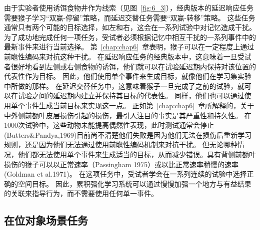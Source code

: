 由于实验者使用诱饵食物井作为线索（见图~\ref{fig:6_3}），经典版本的延迟响应任务需要猴子学习“双赢-停留”策略，而延迟交替任务需要“双赢-转移”策略。
这些任务通常只有两个可能的目标选择，如左和右，这会在一系列试验中对记忆造成干扰。
为了成功地完成任何一项任务，受试者必须根据记忆中相互干扰的一系列事件中的最新事件来进行当前选择。
第~\ref{chap:chap6}~章表明，猴子可以在一定程度上通过前瞻性编码来对抗这种干扰。
在延迟响应任务的经典版本中，这意味着一旦受试者很好地看到左侧或右侧食物的诱饵，他们就可以在试验延迟期内保持对该位置的代表性作为目标。
因此，他们使用单个事件来生成目标，就像他们在学习集实验中所做的那样。
在延迟交替任务中，这意味着猴子一旦完成了之前的试验，就可以在试验之间的延迟期内建立并保持其目标的代表性。
同样，他们也可以通过使用单个事件生成当前目标来实现这一点。
正如第~\ref{chap:chap6}~章所解释的，关于中外侧前额叶皮层损伤引起的损伤，最引人注目的事实是其严重性和持久性。
在1000次试验中，这些动物未能提高偶然性表现，此时测试通常会停止(Butters\&Pandya,1969)目前尚不清楚他们失败是因为他们无法在损伤后重新学习规则，还是因为他们无法通过使用前瞻性编码机制来对抗干扰。
但无论哪种情况，他们都无法使用单个事件来生成适当的目标，从而减少错误。具有背侧前额叶损伤的猴子可以以正常速率（Passingham 1975）或以比正常速率稍慢的速率(Goldman et al.1971)。
在这项任务中，受试者学会在一系列连续的试验中选择正确的空间目标。
因此，累积强化学习系统可以通过慢慢加强一个地方与有益结果的关联来指导行为，而不需要使用任何单一事件。


\subsection{在位对象场景任务}


